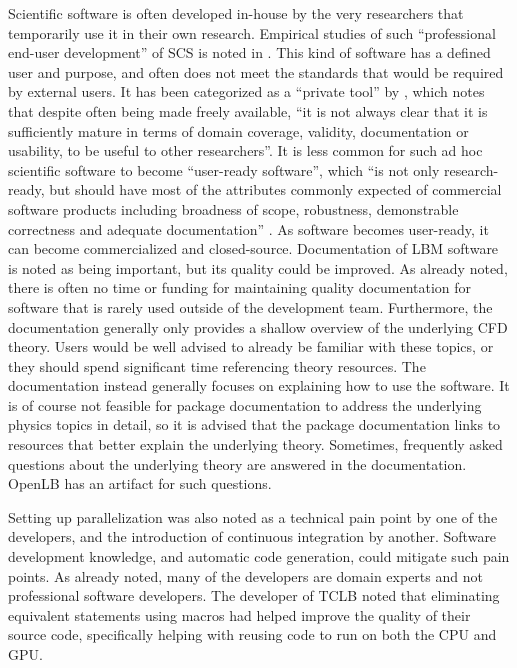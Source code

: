 \documentclass[12pt, notitlepage]{article}
\begin{document}
Scientific software is often developed in-house by the very researchers that temporarily use it in their own research. Empirical studies of such ``professional end-user development'' of SCS is noted in \citep{segal2007end}. This kind of software has a defined user and purpose, and often does not meet the standards that would be required by external users. It has been categorized as a ``private tool'' by \citep{gewaltig2012quality}, which notes that despite often being made freely available, ``it is not always clear that it is sufficiently mature in terms of domain coverage, validity, documentation or usability, to be useful to other researchers''. It is less common for such ad hoc scientific software to become ``user-ready software'', which ``is not only research-ready, but should have most of the attributes commonly expected of commercial software products including broadness of scope, robustness, demonstrable correctness and adequate documentation'' \citep{gewaltig2012quality}. As software becomes user-ready, it can become commercialized and closed-source. Documentation of LBM software is noted as being important, but its quality could be improved. As already noted, there is often no time or funding for maintaining quality documentation for software that is rarely used outside of the development team. Furthermore, the documentation generally only provides a shallow overview of the underlying CFD theory. Users would be well advised to already be familiar with these topics, or they should spend significant time referencing theory resources. The documentation instead generally focuses on explaining how to use the software. It is of course not feasible for package documentation to address the underlying physics topics in detail, so it is advised that the package documentation links to resources that better explain the underlying theory. Sometimes, frequently asked questions about the underlying theory are answered in the documentation. OpenLB has an artifact for such questions.

Setting up parallelization was also noted as a technical pain point by one of the developers, and the introduction of continuous integration by another. Software development knowledge, and automatic code generation, could mitigate such pain points. As already noted, many of the developers are domain experts and not professional software developers. The developer of TCLB noted that eliminating equivalent statements using macros had helped improve the quality of their source code, specifically helping with reusing code to run on both the CPU and GPU. 
\end{document}
